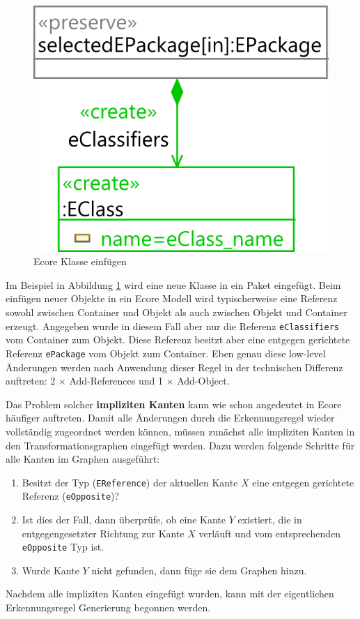 \begin{figure}[htbp]
  \centering
  \includegraphics[scale=0.8]{images/add_eclass.png}
  \caption{Ecore Klasse einfügen}
  \label{fig:add_eclass}
\end{figure}

Im Beispiel in Abbildung \ref{fig:add_eclass} wird eine neue Klasse in ein Paket eingefügt. Beim
einfügen neuer Objekte in ein Ecore Modell wird typischerweise eine Referenz sowohl zwischen
Container und Objekt als auch zwischen Objekt und Container erzeugt. Angegeben wurde in diesem Fall
aber nur die Referenz \texttt{eClassifiers} vom Container zum Objekt. Diese Referenz besitzt aber
eine entgegen gerichtete Referenz \texttt{ePackage} vom Objekt zum Container. Eben genau diese
low-level Änderungen werden nach Anwendung dieser Regel in der technischen Differenz auftreten: 2
$\times$ Add-References und 1 $\times$ Add-Object.

Das Problem solcher \textbf{impliziten Kanten} kann wie schon angedeutet in Ecore häufiger
auftreten. Damit alle Änderungen durch die Erkennungsregel wieder vollständig zugeordnet werden
können, müssen zunächst alle impliziten Kanten in den Transformationsgraphen eingefügt werden. Dazu
werden folgende Schritte für alle Kanten im Graphen ausgeführt:

\begin{enumerate}
  \item Besitzt der Typ (\texttt{EReference}) der aktuellen Kante $X$ eine entgegen gerichtete
  Referenz (\texttt{eOpposite})?
  \item Ist dies der Fall, dann überprüfe, ob eine Kante $Y$ existiert, die in entgegengesetzter
  Richtung zur Kante $X$ verläuft und vom entsprechenden \texttt{eOpposite} Typ ist.
   \item Wurde Kante $Y$ nicht gefunden, dann füge sie dem Graphen hinzu.
\end{enumerate}
Nachdem alle impliziten Kanten eingefügt wurden, kann mit der eigentlichen Erkennungsregel
Generierung begonnen werden.

